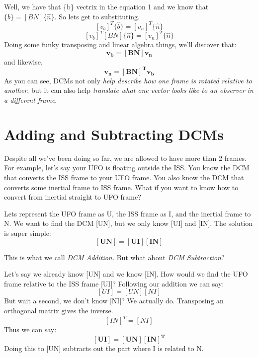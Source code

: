 \documentclass[a4paper,14pt]{extreport}
\begin{document}
Well, we have that \{b\} vectrix in the equation 1 and we know that $\{\hat{b}\} = [BN]\{\hat{n}\}$. So lets get to substituting.
\[[v_b]^T\{\hat{b}\} = [v_n]^T\{\hat{n}\}\]
\[[v_b]^T[BN]\{\hat{n}\} = [v_n]^T\{\hat{n}\}\]
Doing some funky transposing and linear algebra things, we'll discover that:
\[\bm{v_b = [BN]v_n}\]
and likewise,
\[\bm{v_n = [BN]^Tv_b}\]
As you can see, DCMs not only \emph{help describe how one frame is rotated relative to another}, but it can also help \emph{translate what one vector looks like to an observer in a different frame}.
\section{Adding and Subtracting DCMs}
Despite all we've been doing so far, we are allowed to have more than 2 frames. For example, let's say your UFO is floating outside the ISS. You know the DCM that converts the ISS frame to your UFO frame. You also know the DCM that converts some inertial frame to ISS frame. What if you want to know how to convert from inertial straight to UFO frame? 

Lets represent the UFO frame as U, the ISS frame as I, and the inertial frame to N. We want to find the DCM [UN], but we only know [UI] and [IN]. The solution is super simple:
\[\bm{[UN] = [UI][IN]}\]

This is what we call \emph{DCM Addition.} But what about \emph{DCM Subtraction}?

Let's say we already know [UN] and we know [IN]. How would we find the UFO frame relative to the ISS frame [UI]? Following our addition we can say:
\[[UI] = [UN][NI]\]
But wait a second, we don't know [NI]? We actually do. Transposing an orthogonal matrix gives the inverse.
\[[IN]^T = [NI]\]
Thus we can say:
\[\bm{[UI] = [UN][IN]^T}\]
Doing this to [UN] subtracts out the part where I is related to N.
\end{document}
